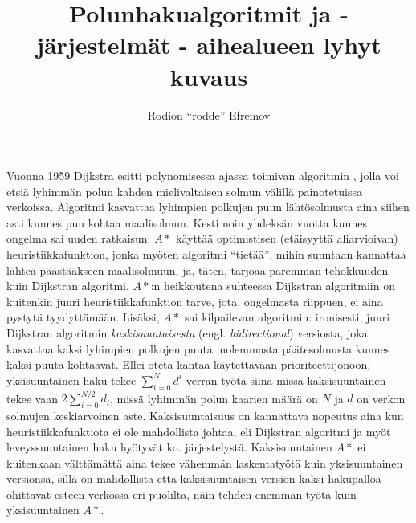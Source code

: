 \documentclass[10pt]{article}
\title{Polunhakualgoritmit ja -järjestelmät - aihealueen lyhyt kuvaus}
\author{Rodion ``rodde'' Efremov}
\begin{document}
 \maketitle
 
\noindent Vuonna 1959 Dijkstra esitti polynomisessa ajassa toimivan algoritmin \cite{Dijkstra59}, jolla voi etsiä lyhimmän polun kahden mielivaltaisen solmun välillä painotetuissa verkoissa. Algoritmi kasvattaa lyhimpien polkujen puun lähtösolmusta aina siihen asti kunnes puu kohtaa maalisolmun. Kesti noin yhdeksän vuotta kunnes ongelma sai uuden ratkaisun: $A\ast$ \cite{Hart68} käyttää optimistisen (etäisyyttä aliarvioivan) heuristiikkafunktion, jonka myöten algoritmi ``tietää'', mihin suuntaan kannattaa lähteä päästääkseen maalisolmuun, ja, täten, tarjoaa paremman tehokkuuden kuin Dijkstran algoritmi. $A\ast$:n heikkoutena suhteessa Dijkstran algoritmiin on kuitenkin juuri heuristiikkafunktion tarve, jota, ongelmasta riippuen, ei aina pystytä tyydyttämään. Lisäksi, $A\ast$ sai kilpailevan algoritmin: ironisesti, juuri Dijkstran algoritmin \textit{kaskisuuntaisesta} (engl. \textit{bidirectional}) versiosta, joka kasvattaa kaksi lyhimpien polkujen puuta molemmasta päätesolmusta kunnes kaksi puuta kohtaavat. Ellei oteta kantaa käytettävään prioriteettijonoon, yksisuuntainen haku tekee $\sum_{i = 0}^N d^i$ verran työtä siinä missä kaksisuuntainen tekee vaan $2\sum_{i = 0}^{N/2} d_i$, missä lyhimmän polun kaarien määrä on $N$ ja $d$ on verkon solmujen keskiarvoinen aste. Kaksisuuntaisuus on kannattava nopeutus aina kun heuristiikkafunktiota ei ole mahdollista johtaa, eli Dijkstran algoritmi ja myöt leveyssuuntainen haku hyötyvät ko. järjestelystä. Kaksisuuntainen $A\ast$ ei kuitenkaan välttämättä aina tekee vähemmän laskentatyötä kuin yksisuuntainen versionsa, sillä on mahdollista että kaksisuuntaisen version kaksi hakupalloa ohittavat esteen verkossa eri puolilta, näin tehden enemmän työtä kuin yksisuuntainen $A\ast$.
\vspace{0.5em}
\end{document}
